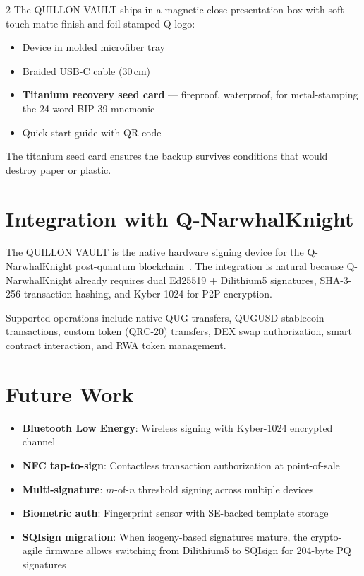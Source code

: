 \documentclass[11pt,a4paper]{article}
\begin{document}
\begin{multicols}{2}
The QUILLON VAULT ships in a magnetic-close presentation box with
soft-touch matte finish and foil-stamped Q logo:

\begin{itemize}[leftmargin=1.2em,itemsep=2pt]
  \item Device in molded microfiber tray
  \item Braided USB-C cable (30\,cm)
  \item \textbf{Titanium recovery seed card} --- fireproof, waterproof,
    for metal-stamping the 24-word BIP-39 mnemonic
  \item Quick-start guide with QR code
\end{itemize}

The titanium seed card ensures the backup survives conditions that would
destroy paper or plastic.

\section{Integration with Q-NarwhalKnight}

The QUILLON VAULT is the native hardware signing device
for the Q-NarwhalKnight post-quantum blockchain~\cite{qnk2026}. The
integration is natural because Q-NarwhalKnight already
requires dual Ed25519 + Dilithium5 signatures, SHA-3-256 transaction
hashing, and Kyber-1024 for P2P encryption.

Supported operations include native QUG transfers, QUGUSD stablecoin
transactions, custom token (QRC-20) transfers, DEX swap authorization,
smart contract interaction, and RWA token management.

\section{Future Work}

\begin{itemize}[leftmargin=1.2em,itemsep=2pt]
  \item \textbf{Bluetooth Low Energy}: Wireless signing with
    Kyber-1024 encrypted channel
  \item \textbf{NFC tap-to-sign}: Contactless transaction
    authorization at point-of-sale
  \item \textbf{Multi-signature}: $m$-of-$n$ threshold
    signing across multiple devices
  \item \textbf{Biometric auth}: Fingerprint sensor
    with SE-backed template storage
  \item \textbf{SQIsign migration}: When isogeny-based signatures
    mature, the crypto-agile firmware allows switching
    from Dilithium5 to SQIsign for 204-byte PQ signatures
\end{itemize}


\end{multicols}
\end{document}
